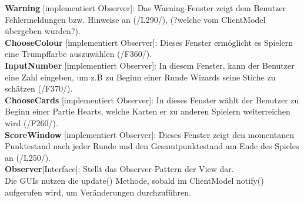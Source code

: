 \documentclass{article}
\begin{document}
\textbf{Warning} [implementiert Observer]: Das Warning-Fenster zeigt dem Benutzer Fehlermeldungen bzw. Hinweise an (/L290/), (?welche vom ClientModel übergeben wurden?). \\

\textbf{ChooseColour} [implementiert Observer]: Dieses Fenster ermöglicht es Spielern eine Trumpffarbe auszuwählen (/F360/). \\

\textbf{InputNumber} [implementiert Observer]: In diesem Fenster, kann der Benutzer eine Zahl eingeben, um z.B zu Beginn einer Runde Wizards seine Stiche zu schätzen (/F370/). \\

\textbf{ChooseCards} [implementiert Observer]: In dieses Fenster wählt der Benutzer zu Beginn einer Partie Hearts, welche Karten er zu anderen Spielern weiterreichen wird (/F260/). \\

\textbf{ScoreWindow} [implementiert Observer]: Dieses Fenster zeigt den momentanen Punktestand nach jeder Runde und den Gesamtpunktestand am Ende des Spieles an (/L250/).\\

\textbf{Observer}[Interface]: Stellt das Observer-Pattern der View dar.\\
 Die GUIs nutzen die update() Methode, sobald im ClientModel notify() aufgerufen wird, um Veränderungen durchzuführen.
\end{document}
